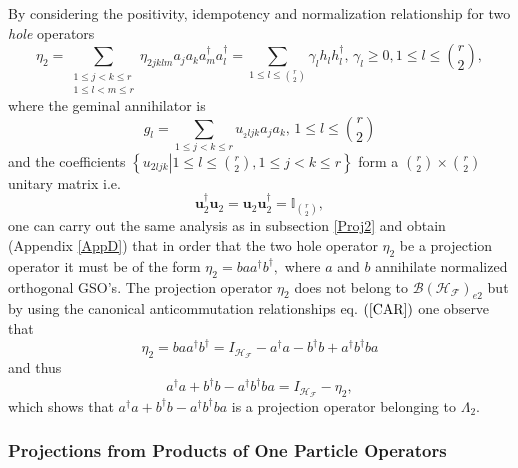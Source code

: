 \documentclass[aps,preprint]{revtex4}%
\begin{document}
By considering the positivity, idempotency and normalization relationship for
two \emph{hole} operators
\begin{equation}
\eta_{2}=\sum_{\substack{1\leq j<k\leq r\\1\leq l<m\leq r}}\eta_{2jklm}%
a_{j}a_{k}a_{m}^{\dagger}a_{l}^{\dagger}=\sum_{1\leq l\leq\binom{r}{2}}%
\gamma_{l}h_{l}h_{l}^{\dagger},\,\gamma_{l}\geq0,1\leq l\leq\binom{r}{2},
\end{equation}
where the geminal annihilator is
\begin{equation}
g_{l}=\sum_{1\leq j<k\leq r}u_{_{2}ljk}a_{j}a_{k},\,1\leq l\leq\binom{r}{2}%
\end{equation}
and the coefficients $\left\{  \left.  u_{2ljk}\right\vert 1\leq l\leq
\binom{r}{2},1\leq j<k\leq r\right\}  $ form a $\binom{r}{2}\times\binom{r}%
{2}$ unitary matrix i.e.
\begin{equation}
\mathbf{u}_{2}^{\dagger}\mathbf{u}_{2}=\mathbf{u}_{2}\mathbf{u}_{2}^{\dagger
}=\mathbb{I}_{\binom{r}{2}},
\end{equation}
one can carry out the same analysis as in subsection \ref{Proj2} and obtain
(Appendix \ref{AppD}) that in order that the two hole operator $\eta_{2}$ be a
projection operator it must be of the form $\eta_{2}=baa^{\dagger}b^{\dagger
},$ where $a$ and $b$ annihilate normalized orthogonal GSO's. The projection
operator $\eta_{2}$ does not belong to $\mathcal{B}\left(  \mathcal{H}%
_{\mathcal{F}}\right)  _{e2}$ but by using the canonical anticommutation
relationships eq. $\left(  \ref{CAR}\right)  $ one observe that
\begin{equation}
\eta_{2}=baa^{\dagger}b^{\dagger}=I_{\mathcal{H}_{\mathcal{F}}}-a^{\dagger
}a-b^{\dagger}b+a^{\dagger}b^{\dagger}ba
\end{equation}
and thus
\begin{equation}
a^{\dagger}a+b^{\dagger}b-a^{\dagger}b^{\dagger}ba=I_{\mathcal{H}%
_{\mathcal{F}}}-\eta_{2},
\end{equation}
which shows that $a^{\dagger}a+b^{\dagger}b-a^{\dagger}b^{\dagger}ba$ is a
projection operator belonging to $\Lambda_{2}.$

\subsubsection{Projections from Products of One Particle Operators}
\end{document}

